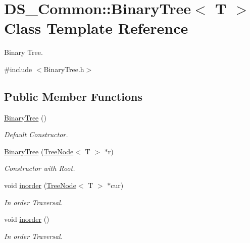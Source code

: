 \hypertarget{class_d_s___common_1_1_binary_tree}{}\section{D\+S\+\_\+\+Common\+:\+:Binary\+Tree$<$ T $>$ Class Template Reference}
\label{class_d_s___common_1_1_binary_tree}


Binary Tree.  




{\ttfamily \#include $<$Binary\+Tree.\+h$>$}

\subsection*{Public Member Functions}
\begin{DoxyCompactItemize}
\item 
\mbox{\hyperlink{class_d_s___common_1_1_binary_tree_a12febe864bcdd97421d884a0cdd84ba0}{Binary\+Tree}} ()
\begin{DoxyCompactList}\small\item\em Default Constructor. \end{DoxyCompactList}\item 
\mbox{\hyperlink{class_d_s___common_1_1_binary_tree_aabe4c48985d51037acfd37b5752671bd}{Binary\+Tree}} (\mbox{\hyperlink{struct_d_s___common_1_1_tree_node}{Tree\+Node}}$<$ T $>$ $\ast$r)
\begin{DoxyCompactList}\small\item\em Constructor with Root. \end{DoxyCompactList}\item 
void \mbox{\hyperlink{class_d_s___common_1_1_binary_tree_add37c15569860383f8e832a046864079}{inorder}} (\mbox{\hyperlink{struct_d_s___common_1_1_tree_node}{Tree\+Node}}$<$ T $>$ $\ast$cur)
\begin{DoxyCompactList}\small\item\em In order Traversal. \end{DoxyCompactList}\item 
void \mbox{\hyperlink{class_d_s___common_1_1_binary_tree_ac60980a1c81e20fb73bf5ed4cfcf5e1d}{inorder}} ()
\begin{DoxyCompactList}\small\item\em In order Traversal. \end{DoxyCompactList}\end{DoxyCompactItemize}


